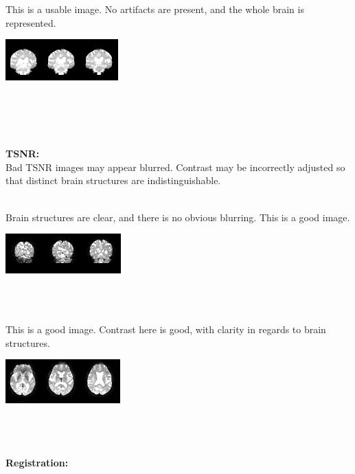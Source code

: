\documentclass{article}
\begin{document}
\noindent\begin{minipage}{0.45\textwidth}
	This is a usable image. No artifacts are present, and the whole brain is represented.
\end{minipage}%
\hfill%
\begin{minipage}{0.45\textwidth}
	\includegraphics[scale=1.045]{meica_good2.png}
\end{minipage}\\\\\\\\
\textbf{TSNR:}\\
Bad TSNR images may appear blurred. Contrast may be incorrectly adjusted so that distinct brain structures are indistinguishable. \\\\
\noindent\begin{minipage}{0.45\textwidth}
	Brain structures are clear, and there is no obvious blurring. This is a good image.
\end{minipage}%
\hfill%
\begin{minipage}{0.45\textwidth}
	\includegraphics[scale=1.025]{tsnr_good2.png}
\end{minipage}\\\\
\noindent\begin{minipage}{0.45\textwidth}
	This is a good image. Contrast here is good, with clarity in regards to brain structures. 
\end{minipage}%
\hfill%
\begin{minipage}{0.45\textwidth}
	\includegraphics[scale=1.025]{tsnr_good1.png}
\end{minipage}\\\\\\
\textbf{Registration:}\\\\
\end{document}

